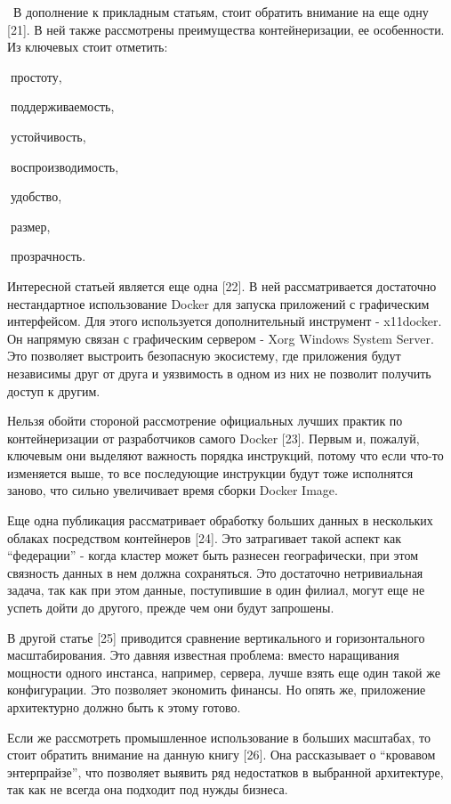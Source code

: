  В дополнение к прикладным статьям, стоит обратить внимание на еще одну [21]. В ней также рассмотрены преимущества контейнеризации, ее особенности. Из ключевых стоит отметить:

простоту,

поддерживаемость,

устойчивость,

воспроизводимость,

удобство,

размер,

прозрачность.

Интересной статьей является еще одна [22]. В ней рассматривается достаточно нестандартное использование Docker для запуска приложений с графическим интерфейсом. Для этого используется дополнительный инструмент - x11docker. Он напрямую связан с графическим сервером - Xorg Windows System Server. Это позволяет выстроить безопасную экосистему, где приложения будут независимы друг от друга и уязвимость в одном из них не позволит получить доступ к другим.

Нельзя обойти стороной рассмотрение официальных лучших практик по контейнеризации от разработчиков самого Docker [23]. Первым и, пожалуй, ключевым они выделяют важность порядка инструкций, потому что если что-то изменяется выше, то все последующие инструкции будут тоже исполнятся заново, что сильно увеличивает время сборки Docker Image.

Еще одна публикация рассматривает обработку больших данных в нескольких облаках посредством контейнеров [24]. Это затрагивает такой аспект как “федерации” - когда кластер может быть разнесен географически, при этом связность данных в нем должна сохраняться. Это достаточно нетривиальная задача, так как при этом данные, поступившие в один филиал, могут еще не успеть дойти до другого, прежде чем они будут запрошены.

В другой статье [25] приводится сравнение вертикального и горизонтального масштабирования. Это давняя известная проблема: вместо наращивания мощности одного инстанса, например, сервера, лучше взять еще один такой же конфигурации. Это позволяет экономить финансы. Но опять же, приложение архитектурно должно быть к этому готово.

Если же рассмотреть промышленное использование в больших масштабах, то стоит обратить внимание на данную книгу [26]. Она рассказывает о “кровавом энтерпрайзе”, что позволяет выявить ряд недостатков в выбранной архитектуре, так как не всегда она подходит под нужды бизнеса.

